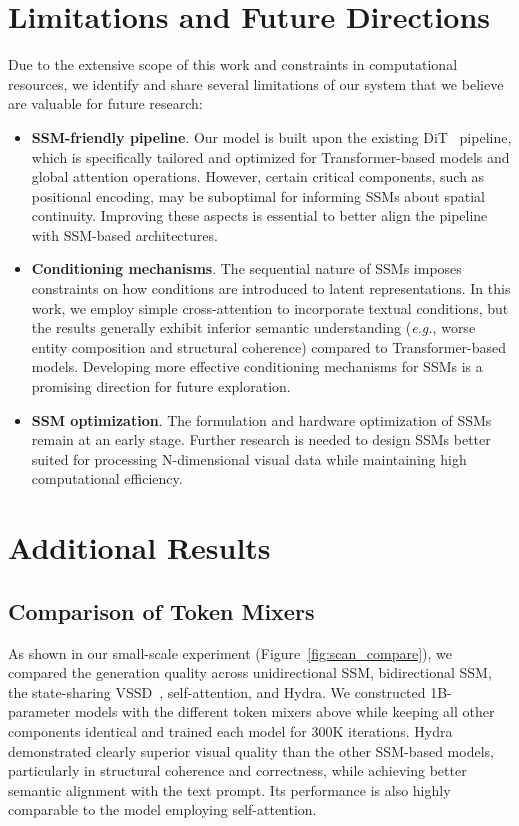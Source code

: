 \section{Limitations and Future Directions}
\label{appsec:limitations}
Due to the extensive scope of this work and constraints in computational resources, we identify and share several limitations of our system that we believe are valuable for future research:
\begin{itemize}
    \item \textbf{SSM-friendly pipeline}. Our model is built upon the existing DiT~\citep{peebles2023dit} pipeline, which is specifically tailored and optimized for Transformer-based models and global attention operations. However, certain critical components, such as positional encoding, may be suboptimal for informing SSMs about spatial continuity. Improving these aspects is essential to better align the pipeline with SSM-based architectures.
    \item \textbf{Conditioning mechanisms}. The sequential nature of SSMs imposes constraints on how conditions are introduced to latent representations. In this work, we employ simple cross-attention to incorporate textual conditions, but the results generally exhibit inferior semantic understanding (\textit{e.g.}, worse entity composition and structural coherence) compared to Transformer-based models. Developing more effective conditioning mechanisms for SSMs is a promising direction for future exploration.  
    \item \textbf{SSM optimization}. The formulation and hardware optimization of SSMs remain at an early stage. Further research is needed to design SSMs better suited for processing N-dimensional visual data while maintaining high computational efficiency. 
\end{itemize}


\section{Additional Results}

\subsection{Comparison of Token Mixers}
\label{appsec:token_mixers}
As shown in our small-scale experiment (Figure~\ref{fig:scan_compare}), we compared the generation quality across unidirectional SSM, bidirectional SSM, the state-sharing VSSD~\citep{shi2024vssd}, self-attention, and Hydra. We constructed 1B-parameter models with the different token mixers above while keeping all other components identical and trained each model for 300K iterations. Hydra demonstrated clearly superior visual quality than the other SSM-based models, particularly in structural coherence and correctness, while achieving better semantic alignment with the text prompt. Its performance is also highly comparable to the model employing self-attention.

